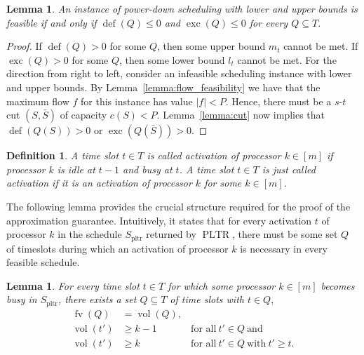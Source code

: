 \documentclass[a4paper]{article}
\DeclareMathOperator{\pltr}{pltr}
\DeclareMathOperator{\PLTR}{PLTR}
\DeclareMathOperator{\fv}{fv}
\DeclareMathOperator{\vol}{vol}
\DeclareMathOperator{\opdef}{def}
\DeclareMathOperator{\exc}{exc}
\newtheorem{lemma}[theorem]{Lemma}
\newtheorem{definition}[theorem]{Definition}
\begin{document}
\begin{lemma}\label{lemma:feasibility}
  An instance of power-down scheduling with lower and upper bounds is feasible if and only if $\opdef(Q) \leq 0$ and $\exc(Q) \leq 0$ for every $Q \subseteq T$.
\end{lemma}
\begin{proof}
  If $\opdef(Q) > 0$ for some $Q$, then some upper bound $m_t$ cannot be met.
  If $\exc(Q) > 0$ for some $Q$, then some lower bound $l_t$ cannot be met.
  For the direction from right to left, consider an infeasible scheduling instance with lower and upper bounds.
  By Lemma~\ref{lemma:flow_feasibility} we have that the maximum flow $f$ for this instance has value $|f| < P$.
  Hence, there must be a $s$-$t$ cut $(S, \bar S)$ of capacity $c(S) < P$.
  Lemma~\ref{lemma:cut} now implies that $\opdef(Q(S)) > 0$ or $\exc(Q(\bar S)) > 0$.
\end{proof}
\begin{definition}
  A time slot $t \in T$ is called \emph{activation of processor $k \in [m]$} if processor $k$ is idle at $t-1$ and busy at $t$.
  A time slot $t \in T$ is just called \emph{activation} if it is an activation of processor $k$ for some $k \in [m]$.
\end{definition}
The following lemma provides the crucial structure required for the proof of the approximation guarantee.
Intuitively, it states that for every activation $t$ of processor $k$ in the schedule $S_{\pltr}$ returned by $\PLTR$, there must be some set $Q$ of timeslots during which an activation of processor $k$ is necessary in every feasible schedule.
\begin{lemma}\label{lemma:critical}
  For every time slot $t \in T$ for which some processor $k \in [m]$ becomes busy in $S_{\pltr}$, there exists a set $Q \subseteq T$ of time slots with $t \in Q, $
  \begin{align}
    \fv(Q) &= \vol(Q) \text{,}\\
    \vol(t') &\geq k-1 &~\text{for all}~t' \in Q~\text{and}\\
    \vol(t') &\geq k &~\text{for all}~t' \in Q~\text{with}~t' \geq t \text{.}
  \end{align}
\end{lemma}
\end{document}
